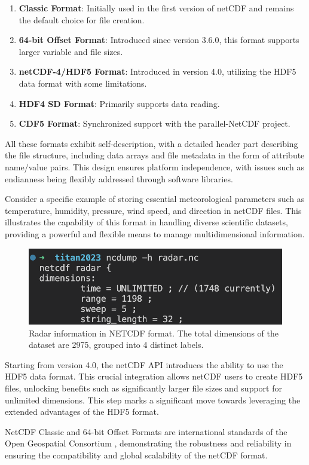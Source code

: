 \begin{enumerate}
    \item \textbf{Classic Format}: Initially used in the first version of netCDF and
    remains the default choice for file creation.
    \item \textbf{64-bit Offset Format}: Introduced since version 3.6.0, this format
    supports larger variable and file sizes.
    \item \textbf{netCDF-4/HDF5 Format}: Introduced in version 4.0, utilizing the HDF5
    data format with some limitations.
    \item \textbf{HDF4 SD Format}: Primarily supports data reading.
    \item \textbf{CDF5 Format}: Synchronized support with the parallel-NetCDF project.
\end{enumerate}

All these formats exhibit self-description, with a detailed header part
describing the file structure, including data arrays and file metadata in the
form of attribute name/value pairs. This design ensures platform independence,
with issues such as endianness being flexibly addressed through software
libraries.

Consider a specific example of storing essential meteorological parameters such
as temperature, humidity, pressure, wind speed, and direction in netCDF files.
This illustrates the capability of this format in handling diverse scientific
datasets, providing a powerful and flexible means to manage multidimensional
information.

\begin{figure}[H]
    \centering
    \includegraphics[width=1\linewidth]{Images/ncdump.png}
    \vspace{1em}
    \caption{Radar information in NETCDF format. The total dimensions of the dataset are 2975, grouped into 4 distinct labels.}
    \label{fig:enter-label}
\end{figure}

Starting from version 4.0, the netCDF API introduces the ability to use the HDF5
data format. This crucial integration allows netCDF users to create HDF5 files,
unlocking benefits such as significantly larger file sizes and support for
unlimited dimensions. This step marks a significant move towards leveraging the
extended advantages of the HDF5 format.

NetCDF Classic and 64-bit Offset Formats are international standards of the Open
Geospatial Consortium \cite{ogcnetcdf}, demonstrating the robustness and
reliability in ensuring the compatibility and global scalability of the netCDF
format.
